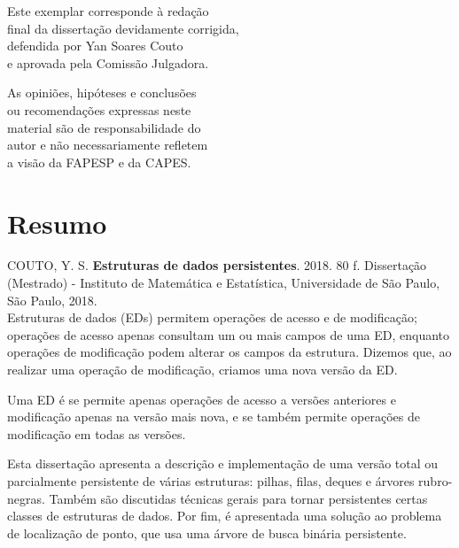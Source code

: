 \documentclass[11pt,oneside,a4paper, openany]{book}
\begin{document}
    \vskip 2cm

    \begin{flushright}
	Este exemplar corresponde à redação \\
	final da dissertação devidamente corrigida, \\
	defendida por Yan Soares Couto \\
	e aprovada pela Comissão Julgadora.
    \end{flushright}

    \vskip 2cm

    \begin{flushright}
	As opiniões, hipóteses e conclusões \\
	ou recomendações expressas neste \\
	material são de responsabilidade do \\
	autor e não necessariamente refletem \\
	a visão da FAPESP e da CAPES.
    \end{flushright}

\pagebreak

\chapter*{Resumo}

\noindent COUTO, Y. S. \textbf{Estruturas de dados persistentes}.
2018. 80 f.
Dissertação (Mestrado) - Instituto de Matemática e Estatística,
Universidade de São Paulo, São Paulo, 2018.
\\

Estruturas de dados (EDs) permitem operações de acesso e de modificação; operações de acesso apenas consultam um ou mais campos de uma ED, enquanto operações de modificação podem alterar os campos da estrutura. Dizemos que, ao realizar uma operação de modificação, criamos uma nova versão da ED.

Uma ED é  se permite apenas operações de acesso a versões anteriores e modificação apenas na versão mais nova, e  se também permite operações de modificação em todas as versões.

Esta dissertação apresenta a descrição e implementação de uma versão total ou parcialmente persistente de várias estruturas: pilhas, filas, deques e árvores rubro-negras. Também são discutidas técnicas gerais para tornar persistentes certas classes de estruturas de dados. Por fim, é apresentada uma solução ao problema de localização de ponto, que usa uma árvore de busca binária persistente.
\\
\end{document}
